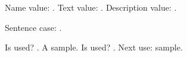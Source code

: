 \documentclass{article}
\begin{document}
Name value: .
Text value: .
Description value: .

Sentence case: .

Is used? .
A \gls{sample}.
Is used? .
Next use: \gls{sample}.
\end{document}
